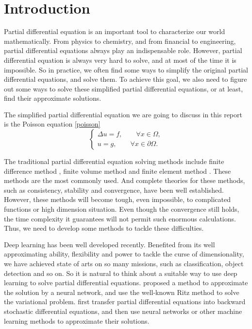 \documentclass{article}
\begin{document}
\section{Introduction}
\par Partial differential equation \cite{evans1998partial} is an important tool to characterize our world mathematically. From physics to chemistry, and from financial to engineering, partial differential equations always play an indispensable role. However, partial differential equation is always very hard to solve, and at most of the time it is impossible. So in practice, we often find some ways to simplify the original partial differential equations, and solve them. To achieve this goal, we also need to figure out some ways to solve these simplified partial differential equations, or at least, find their approximate solutions.
\par The simplified partial differential equation we are going to discuss in this report is the Poisson equation 
\eqref{poisson}
\begin{equation}\label{poisson}
	\begin{cases}
		\Delta u = f, \qquad\forall x\in\Omega,\\
		u = g, \qquad\forall x\in\partial\Omega.
	\end{cases}
\end{equation}
\par The traditional partial differential equation solving methods include finite difference method \cite{strikwerda2004finite}, finite volume method \cite{versteeg2007introduction} and finite element method \cite{brenner2007mathematical}. These methods are the most commonly used. And complete theories for these methods, such as consistency, stability and convergence, have been well established. However, these methods will become tough, even impossible, to complicated functions or high dimension situation. Even though the convergence still holds, the time complexity it guarantees will not permit such enormous calculations. Thus, we need to develop some methods to tackle these difficulties.
\par Deep learning \cite{lecun2015deep} has been well developed recently. Benefited from its well approximating ability, flexibility and power to tackle the curse of dimensionality, we have achieved state of arts on so many missions, such as classification, object detection and so on. So it is natural to think about a suitable way to use deep learning to solve partial differential equations. \cite{yu2017deep} proposed a method to approximate the solution by a neural network, and use the well-known Ritz method to solve the variational problem. \cite{1707.02568}\cite{weinan2017deep}\cite{beck2017machine} first transfer partial differential equations into backward stochastic differential equations, and then use neural networks or other machine learning methods to approximate their solutions.
\end{document}
